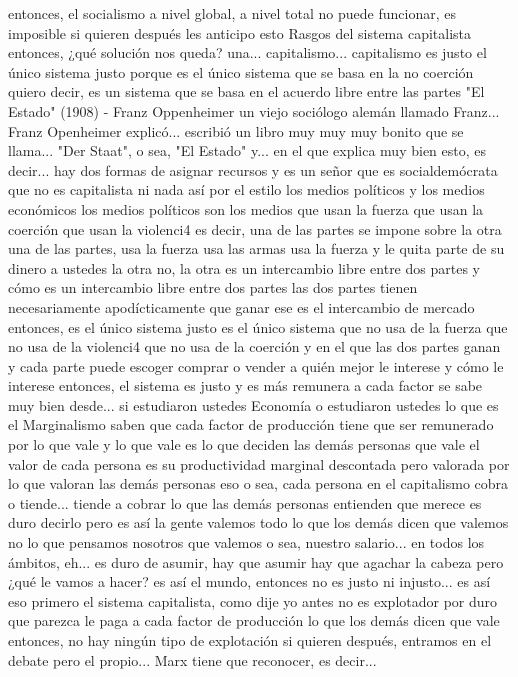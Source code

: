 entonces, el socialismo a nivel global, a nivel total no puede funcionar, es imposible si quieren después les anticipo esto
Rasgos del sistema capitalista
entonces, ¿qué solución nos queda? una... capitalismo...
capitalismo es justo el único sistema justo porque es el único sistema
que se basa en la no coerción quiero decir, es un sistema que se basa en el acuerdo libre entre las partes
"El Estado" (1908) - Franz Oppenheimer
un viejo sociólogo alemán llamado Franz... Franz Openheimer explicó...
escribió un libro muy muy muy bonito que se llama... "Der Staat", o sea, "El Estado" y... en el que explica muy bien esto, es decir...
hay dos formas de asignar recursos y es un señor que es socialdemócrata que no es capitalista ni nada así por el estilo los medios políticos y los medios económicos
los medios políticos son los medios que usan la fuerza que usan la coerción
que usan la violenci4 es decir, una de las partes se impone sobre la otra una de las partes, usa la fuerza
usa las armas usa la fuerza y le quita parte de su dinero a ustedes la otra no, la otra
es un intercambio libre entre dos partes y cómo es un intercambio libre entre dos partes las dos partes
tienen necesariamente apodícticamente que ganar
ese es el intercambio de mercado entonces, es el único sistema justo es el único sistema que no usa de la fuerza
que no usa de la violenci4 que no usa de la coerción y en el que las dos partes ganan y cada parte puede escoger
comprar o vender a quién mejor le interese y cómo le interese entonces, el sistema es justo y es más remunera a cada factor
se sabe muy bien desde... si estudiaron ustedes Economía o estudiaron ustedes lo que es el Marginalismo saben que cada factor de producción
tiene que ser remunerado por lo que vale y lo que vale es lo que deciden las demás personas que vale
el valor de cada persona es su productividad marginal descontada pero valorada
por lo que valoran las demás personas eso o sea, cada persona en el capitalismo cobra o tiende... tiende a cobrar
lo que las demás personas entienden que merece es duro decirlo pero es así la gente valemos todo
lo que los demás dicen que valemos no lo que pensamos nosotros que valemos o sea, nuestro salario... en todos los ámbitos, eh...
es duro de asumir, hay que asumir hay que agachar la cabeza pero ¿qué le vamos a hacer? es así el mundo, entonces no es justo ni injusto... es así
eso primero el sistema capitalista, como dije yo antes no es explotador
por duro que parezca le paga a cada factor de producción lo que los demás dicen que vale entonces, no hay ningún tipo de explotación
si quieren después, entramos en el debate pero el propio... Marx tiene que reconocer, es decir...
